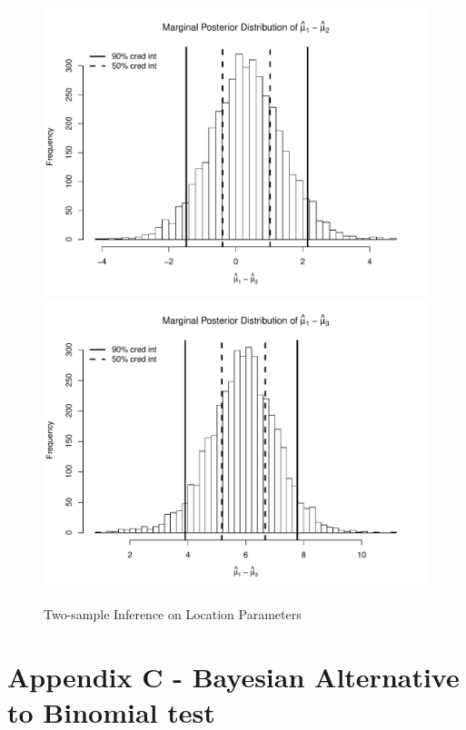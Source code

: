 \documentclass[12pt]{article}
\begin{document}
\begin{figure}[H]\caption[]{Two-sample Inference on Location Parameters}
\begin{minipage}{1\linewidth}
  \centering
\includegraphics[trim={0cm 0cm 0cm 0cm}, clip, scale=0.4]{../figs/norm2.pdf}
\includegraphics[trim={0cm 0cm 0cm 0cm}, clip, scale=0.4]{../figs/norm3.pdf}
\footnotesize
\end{minipage}
\end{figure}

\pagebreak

\section{Appendix C - Bayesian Alternative to Binomial test}
\end{document}

